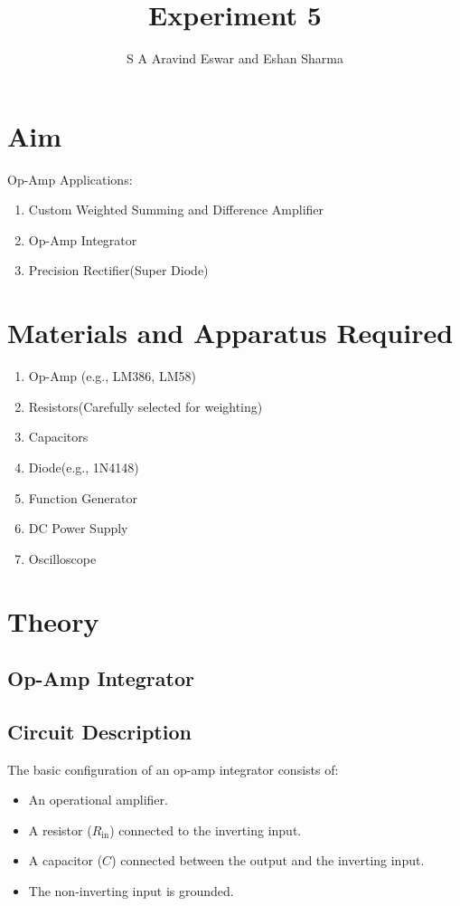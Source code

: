 \documentclass[journal]{IEEEtran}
\begin{document}

\vspace{3cm}

\title{Experiment 5} 
\author{S A Aravind Eswar and Eshan Sharma}
{\let\newpage\relax\maketitle}

\section{Aim}
Op-Amp Applications:
\begin{enumerate}
	\item Custom Weighted Summing and Difference Amplifier
	\item Op-Amp Integrator
	\item Precision Rectifier(Super Diode)
\end{enumerate}

\section{Materials and Apparatus Required}

\begin{enumerate}
	\item Op-Amp (e.g., LM386, LM58)
	\item Resistors(Carefully selected for weighting)
	\item Capacitors
	\item Diode(e.g., 1N4148)
	\item Function Generator
	\item DC Power Supply
	\item Oscilloscope
\end{enumerate}

\section{Theory}
	\subsection{Op-Amp Integrator}
	
	\subsection*{Circuit Description}
	The basic configuration of an op-amp integrator consists of:
	\begin{itemize}
		\item An operational amplifier.
		\item A resistor (\(R_{\text{in}}\)) connected to the inverting input.
		\item A capacitor (\(C\)) connected between the output and the inverting input.
		\item The non-inverting input is grounded.
	\end{itemize}
	
\end{document}
